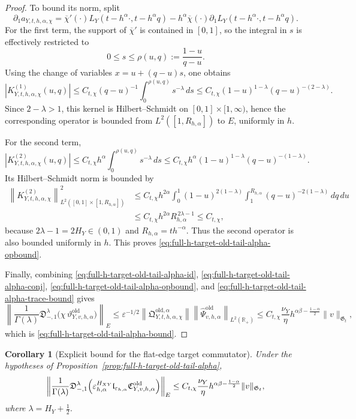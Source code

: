 \documentclass[11pt,a4paper]{amsart}
\theoremstyle{plain}
\newtheorem{corollary}[theorem]{Corollary}
\theoremstyle{definition}
\theoremstyle{remark}
\newcommand{\R}{\mathbb{R}}
\begin{document}
\begin{proof}
To bound its norm, split
\[
\partial_1 a_{Y,t,h,\alpha,\chi}
=
\overline\chi'(\cdot)L_Y(t-h^\alpha\cdot,t-h^\alpha q)
-h^\alpha \overline\chi(\cdot)\partial_1L_Y(t-h^\alpha\cdot,t-h^\alpha q).
\]
For the first term, the support of \(\overline\chi'\) is contained in \([0,1]\), so the integral in
\(s\) is effectively restricted to
\[
0\le s\le \rho(u,q):=\frac{1-u}{q-u}.
\]
Using the change of variables \(x=u+(q-u)s\), one obtains
\[
\left|
K_{Y,t,h,\alpha,\chi}^{(1)}(u,q)
\right|
\le
C_{t,\chi}(q-u)^{-1}
\int_0^{\rho(u,q)} s^{-\lambda}\,ds
\le
C_{t,\chi}(1-u)^{1-\lambda}(q-u)^{-(2-\lambda)}.
\]
Since \(2-\lambda>1\), this kernel is Hilbert--Schmidt on
\([0,1]\times[1,\infty)\), hence the corresponding operator is bounded from
\(L^2([1,R_{h,\alpha}])\) to \(E\), uniformly in \(h\).

For the second term,
\[
\left|
K_{Y,t,h,\alpha,\chi}^{(2)}(u,q)
\right|
\le
C_{t,\chi}h^\alpha
\int_0^{\rho(u,q)} s^{-\lambda}\,ds
\le
C_{t,\chi}h^\alpha(1-u)^{1-\lambda}(q-u)^{-(1-\lambda)}.
\]
Its Hilbert--Schmidt norm is bounded by
\begin{align*}
\left\|
K_{Y,t,h,\alpha,\chi}^{(2)}
\right\|_{L^2([0,1]\times[1,R_{h,\alpha}])}^2
&\le
C_{t,\chi}h^{2\alpha}
\int_0^1
(1-u)^{2(1-\lambda)}
\int_1^{R_{h,\alpha}}
(q-u)^{-2(1-\lambda)}\,dq\,du\\
&\le
C_{t,\chi}h^{2\alpha}R_{h,\alpha}^{\,2\lambda-1}
\le
C_{t,\chi},
\end{align*}
because \(2\lambda-1=2H_Y\in(0,1)\) and \(R_{h,\alpha}=th^{-\alpha}\). Thus the second operator is
also bounded uniformly in \(h\). This proves \eqref{eq:full-h-target-old-tail-alpha-opbound}.

Finally, combining \eqref{eq:full-h-target-old-tail-alpha-id},
\eqref{eq:full-h-target-old-tail-alpha-conj},
\eqref{eq:full-h-target-old-tail-alpha-opbound}, and
\eqref{eq:full-h-target-old-tail-alpha-trace-bound} gives
\[
\left\|
\frac{1}{\Gamma(\lambda)}
\mathfrak D_{-,1}^{\lambda}
\bigl(
\chi\,\vartheta_{Y,v,h,\alpha}^{\mathrm{old}}
\bigr)
\right\|_E
\le
\varepsilon^{-1/2}
\left\|
\mathfrak Q_{Y,t,h,\alpha,\chi}^{\mathrm{old},\alpha}
\right\|
\left\|
\widehat\Psi_{v,h,\alpha}^{\mathrm{old}}
\right\|_{L^2(\R_+)}
\le
C_{t,\chi}\frac{\nu_Y}{\eta}
h^{\alpha\beta-\frac{1-\alpha}{2}}
\|v\|_{\mathfrak G_t},
\]
which is \eqref{eq:full-h-target-old-tail-alpha-bound}.
\end{proof}

\begin{corollary}[Explicit bound for the flat-edge target commutator]
\label{cor:full-h-target-old-tail-alpha}
Under the hypotheses of Proposition~\ref{prop:full-h-target-old-tail-alpha},
\begin{equation}\label{eq:full-h-target-old-tail-alpha-criterion}
\left\|
\frac{1}{\Gamma(\lambda)}
\mathfrak D_{-,1}^{\lambda}
\Bigl(
\varepsilon_{h,\alpha}^{H_{XY}}
\mathfrak l_{\varepsilon_{h,\alpha}}
\mathfrak C_{Y,v,h,\alpha}^{\mathrm{old}}
\Bigr)
\right\|_{E}
\le
C_{t,\chi}\frac{\nu_Y}{\eta}
h^{\alpha\beta-\frac{1-\alpha}{2}}
\|v\|_{\mathfrak G_t},
\end{equation}
where \(\lambda=H_Y+\frac12\).
\end{corollary}
\end{document}
